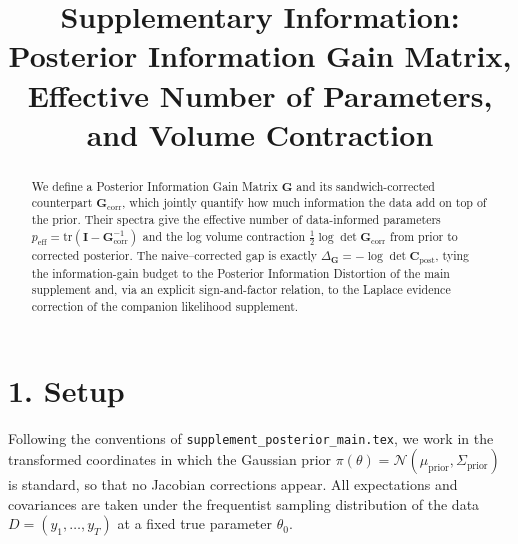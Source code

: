 \documentclass[11pt]{article}
\title{Supplementary Information: Posterior Information Gain Matrix, Effective Number of Parameters, and Volume Contraction}
\author{}
\date{}
\begin{document}
\maketitle

\begin{abstract}
We define a Posterior Information Gain Matrix $\mathbf G$ and its sandwich-corrected counterpart $\mathbf G_{\mathrm{corr}}$, which jointly quantify how much information the data add on top of the prior. Their spectra give the effective number of data-informed parameters $p_{\mathrm{eff}} = \mathrm{tr}(\mathbf I - \mathbf G_{\mathrm{corr}}^{-1})$ and the log volume contraction $\tfrac{1}{2}\log\det \mathbf G_{\mathrm{corr}}$ from prior to corrected posterior. The naive--corrected gap is exactly $\Delta_{\mathbf G} = -\log\det \mathbf C_{\mathrm{post}}$, tying the information-gain budget to the Posterior Information Distortion of the main supplement and, via an explicit sign-and-factor relation, to the Laplace evidence correction of the companion likelihood supplement.
\end{abstract}


\section*{1. Setup}

Following the conventions of \texttt{supplement\_posterior\_main.tex}, we work in the transformed coordinates in which the Gaussian prior $\pi(\theta) = \mathcal{N}(\mu_{\mathrm{prior}}, \Sigma_{\mathrm{prior}})$ is standard, so that no Jacobian corrections appear. All expectations and covariances are taken under the frequentist sampling distribution of the data $D = (y_1,\ldots,y_T)$ at a fixed true parameter $\theta_0$.
\end{document}
